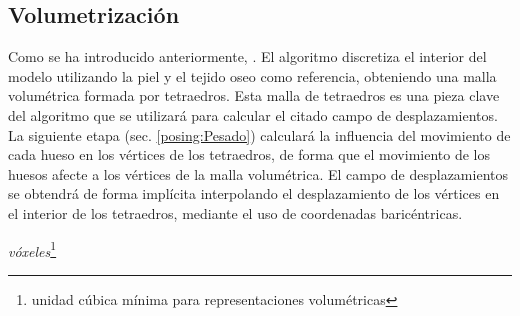 \subsection{Volumetrización}
\label{posing:volumetrizacion}
%
Como se ha introducido anteriormente, . El algoritmo discretiza el interior del modelo utilizando la piel y el tejido oseo como referencia, obteniendo una malla volumétrica formada por tetraedros. Esta malla de tetraedros es una pieza clave del algoritmo que se utilizará para calcular el citado campo de desplazamientos. La siguiente etapa (sec. \ref{posing:Pesado}) calculará la influencia del movimiento de cada hueso en los vértices de los tetraedros, de forma que el movimiento de los huesos afecte a los vértices de la malla volumétrica. El campo de desplazamientos se obtendrá de forma implícita interpolando el desplazamiento de los vértices en el interior de los tetraedros, mediante el uso de coordenadas baricéntricas. 


 \emph{vóxeles}\footnote{unidad cúbica mínima para representaciones volumétricas}

